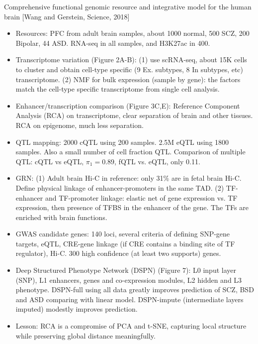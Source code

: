 \documentclass{report}
\begin{document}
Comprehensive functional genomic resource and integrative model for the human brain [Wang and Gerstein, Science, 2018]
\begin{itemize}
	
	\item Resources: PFC from adult brain samples, about 1000 normal, 500 SCZ, 200 Bipolar, 44 ASD. RNA-seq in all samples, and H3K27ac in 400. 
	
	\item Transcriptome variation (Figure 2A-B): (1) use scRNA-seq, about 15K cells to cluster and obtain cell-type specific (9 Ex. subtypes, 8 In subtypes, etc) transcriptome. (2) NMF for bulk expression (sample by gene): the factors match the cell-type specific transcriptome from single cell analysis. 
	
	\item Enhancer/transcription comparison (Figure 3C,E): Reference Component Analysis (RCA) on transcriptome, clear separation of brain and other tissues. RCA on epigenome, much less separation. 
	
	\item QTL mapping: 2000 cQTL using 200 samples. 2.5M eQTL using 1800 samples. Also a small number of cell fraction QTL. Comparison of multiple QTL: cQTL vs eQTL, $\pi_1 = 0.89$, fQTL vs. eQTL, only 0.11. 
	
	\item GRN: (1) Adult brain Hi-C in reference: only 31\% are in fetal brain Hi-C. Define physical linkage of enhancer-promoters in the same TAD. (2) TF-enhancer and TF-promoter linkage: elastic net of gene expression vs. TF expression, then presence of TFBS in the enhancer of the gene. The TFs are enriched with brain functions. 
	
	\item GWAS candidate genes: 140 loci, several criteria of defining SNP-gene targets, eQTL, CRE-gene linkage (if CRE contains a binding site of TF regulator), Hi-C. 300 high confidence (at least two supports) genes.  
	
	\item Deep Structured Phenotype Network (DSPN) (Figure 7):  L0 input layer (SNP), L1 enhancers, genes and co-expression modules, L2 hidden and L3 phenotype. DSPN-full using all data greatly improves prediction of SCZ, BSD and ASD comparing with linear model. DSPN-impute (intermediate layers imputed) modestly improves prediction. 
	
	\item Lesson: RCA is a compromise of PCA and t-SNE, capturing local structure while preserving global distance meaningfully.  
	

\end{itemize}
\end{document}
